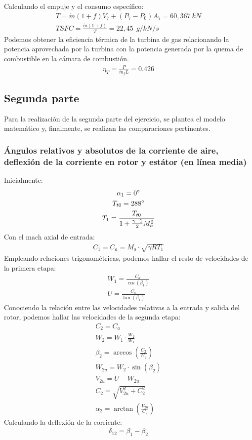 \documentclass{report}
\begin{document}
Calculando el empuje y el consumo específico:
\begin{gather}
T = \Dot{m} (1+f) V_7 + (P_7-P_0)A_7=60,367\:kN\\
TSFC = \frac{\Dot{m} (1+f)}{T}=\boxed{22,45\:\ g/kN/s}
\end{gather}
Podemos obtener la eficiencia térmica de la turbina de gas relacionando la potencia aprovechada por la turbina con la potencia generada por la quema de combustible en la cámara de combustión.
\begin{gather}
\eta_T = \frac{P}{\Dot{m}_f L}=\boxed{0.426}
\end{gather}
\newpage
\subsection{Segunda parte}
Para la realización de la segunda parte del ejercicio, se plantea el modelo matemático y, finalmente, se realizan las comparaciones pertinentes.
\subsubsection{Ángulos relativos y absolutos de la corriente de aire, deflexión de la corriente en rotor y estátor (en línea media)}
Inicialmente:
\begin{gather}
\alpha_1 = 0\degree\\
T_{t0} = 288\degree\\
T_{1} = \frac{T_{t0}}{1+\frac{\gamma-1}{2}M_a^2}
\end{gather}
Con el mach axial de entrada:
\begin{gather}
C_1 = C_a = M_a \cdot \sqrt{\gamma R T_1}
\end{gather}
Empleando relaciones trigonométricas, podemos hallar el resto de velocidades de la primera etapa:
\begin{gather}
W_1 = \frac{C_a}{\cos(\beta_1)}\\
U = \frac{C_a}{\tan(\beta_1)}
\end{gather}
Conociendo la relación entre las velocidades relativas a la entrada y salida del rotor, podemos hallar las velocidades de la segunda etapa:
\begin{gather}
C_2 = C_a\\
W_2 = W_1 \cdot \frac{W_2}{W_1}\\
\beta_2 = \arccos\left(\frac{C_2}{W_2}\right)\\
W_{2u} = W_2 \cdot \sin(\beta_2)\\
V_{2u} = U - W_{2u}\\
C_2 = \sqrt{V_{2u}^2 + C_2^2}\\
\alpha_2 = \arctan\left(\frac{V_{2u}}{C_2}\right)
\end{gather}
Calculando la deflexión de la corriente:
\begin{gather}
\delta_{12} = \beta_1 - \beta_2
\end{gather}
\end{document}
